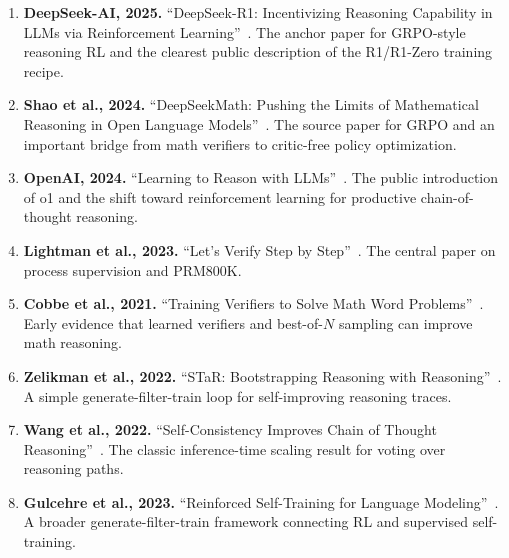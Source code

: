 \begin{enumerate}[nosep]
  \item \textbf{DeepSeek-AI, 2025.} ``DeepSeek-R1: Incentivizing Reasoning Capability in LLMs via Reinforcement Learning''~\cite{deepseekai2025r1}. The anchor paper for GRPO-style reasoning RL and the clearest public description of the R1/R1-Zero training recipe.
  \item \textbf{Shao et al., 2024.} ``DeepSeekMath: Pushing the Limits of Mathematical Reasoning in Open Language Models''~\cite{shao2024deepseekmath}. The source paper for GRPO and an important bridge from math verifiers to critic-free policy optimization.
  \item \textbf{OpenAI, 2024.} ``Learning to Reason with LLMs''~\cite{openai2024reasoning}. The public introduction of o1 and the shift toward reinforcement learning for productive chain-of-thought reasoning.
  \item \textbf{Lightman et al., 2023.} ``Let's Verify Step by Step''~\cite{lightman2023verify}. The central paper on process supervision and PRM800K.
  \item \textbf{Cobbe et al., 2021.} ``Training Verifiers to Solve Math Word Problems''~\cite{cobbe2021gsm8k}. Early evidence that learned verifiers and best-of-$N$ sampling can improve math reasoning.
  \item \textbf{Zelikman et al., 2022.} ``STaR: Bootstrapping Reasoning with Reasoning''~\cite{zelikman2022star}. A simple generate-filter-train loop for self-improving reasoning traces.
  \item \textbf{Wang et al., 2022.} ``Self-Consistency Improves Chain of Thought Reasoning''~\cite{wang2022selfconsistency}. The classic inference-time scaling result for voting over reasoning paths.
  \item \textbf{Gulcehre et al., 2023.} ``Reinforced Self-Training for Language Modeling''~\cite{gulcehre2023rest}. A broader generate-filter-train framework connecting RL and supervised self-training.
\end{enumerate}

\flushbottom
